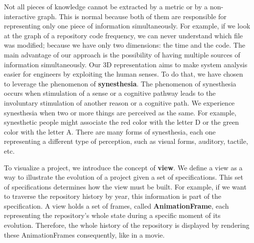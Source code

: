 Not all pieces of knowledge cannot be extracted by a metric or by a non-interactive graph. This is normal because both of them are responsible for representing only one piece of information simultaneously. For example, if we look at the graph of a repository code frequency, we can never understand which file was modified; because we have only two dimensions: the time and the code. The main advantage of our approach is the possibility of having multiple sources of information simultaneously. Our 3D representation aims to make system analysis easier for engineers by exploiting the human senses.
To do that, we have chosen to leverage the phenomenon of \textbf{synesthesia}. The phenomenon of synesthesia occurs when stimulation of a sense or a cognitive pathway leads to the involuntary stimulation of another reason or a cognitive path. We experience synesthesia when two or more things are perceived as the same. 
For example, synesthetic people might associate the red color with the letter D or the green color with the letter A. 
There are many forms of synesthesia, each one representing a different type of perception, such as visual forms, auditory, tactile, etc.

To visualize a project, we introduce the concept of \textbf{view}. We define a view as a way to illustrate the evolution of a project given a set of specifications. This set of specifications determines how the view must be built. For example, if we want to traverse the repository history by year, this information is part of the specification. A view holds a set of frames, called \textbf{AnimationFrame}, each representing the repository's whole state during a specific moment of its evolution. Therefore, the whole history of the repository is displayed by rendering these AnimationFrames consequently, like in a movie. 

